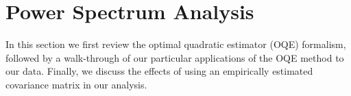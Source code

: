 \documentclass[twocolumn,numberedappendix]{emulateapj} \shorttitle{PSA64}
\begin{document}
\section{Power Spectrum Analysis}\label{sec:oqe}

In this section we first
review the optimal quadratic estimator (OQE) formalism, followed by a walk-through of our 
particular applications of the OQE
method to our data. Finally, we discuss the effects of using an empirically estimated 
covariance matrix in our analysis.
\end{document}
